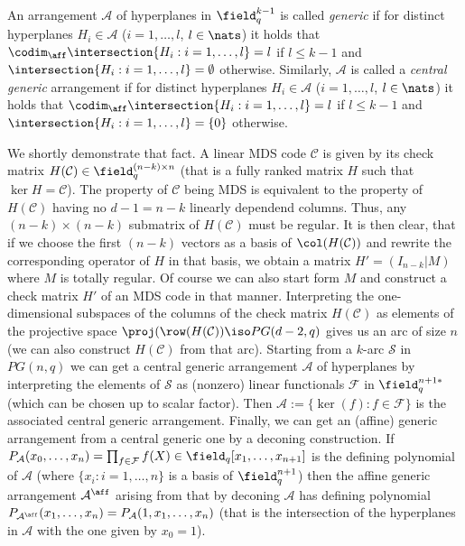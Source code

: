 \message{ !name(OnTheRAIDProblem.tex)}\documentclass[8pt,a4paper]{article}
\begin{document}
\begin{definition}
An arrangement $\mathcal{A}$ of hyperplanes in $\field_q^{k-1}$ is called \emph{generic} if for distinct hyperplanes $H_i\in\mathcal{A}$ ($i=1,\ldots,l$, $l\in\nats$) it holds that $\codim_{\aff}\intersection\{H_i:i=1,\ldots,l\}=l$ if $l\leq k-1$ and $\intersection\{H_i:i=1,\ldots,l\}=\emptyset$ otherwise.
Similarly, $\mathcal{A}$ is called a \emph{central generic} arrangement if for distinct hyperplanes $H_i\in\mathcal{A}$ ($i=1,\ldots,l$, $l\in\nats$) it holds that $\codim_{\aff}\intersection\{H_i:i=1,\ldots,l\}=l$ if $l\leq k-1$ and $\intersection\{H_i:i=1,\ldots,l\}=\{0\}$ otherwise.
\end{definition}

We shortly demonstrate that fact.
A linear MDS code $\mathcal{C}$ is given by its check matrix $H(\mathcal{C})\in\field^{(n-k)\times n}_q$ (that is a fully ranked matrix $H$ such that $\ker H=\mathcal{C}$). The property of $\mathcal{C}$ being MDS is equivalent to the property of $H(\mathcal{C})$ having no $d-1=n-k$ linearly dependend columns. Thus, any $(n-k)\times(n-k)$ submatrix of $H(\mathcal{C})$ must be regular. It is then clear, that if we choose the first $(n-k)$ vectors as a basis of $\col(H(\mathcal{C}))$ and rewrite the corresponding operator of $H$ in that basis, we obtain a matrix $H'=(I_{n-k}|M)$ where $M$ is totally regular. Of course we can also start form $M$ and construct a check matrix $H'$ of an MDS code in that manner. 
Interpreting the one-dimensional subspaces of the columns of the check matrix $H(\mathcal{C})$ as elements of the projective space $\proj(\row(H(\mathcal{C}))\iso PG(d-2,q)$ gives us an arc of size $n$ (we can also construct $H(\mathcal{C})$ from that arc).
Starting from a $k$-arc $\mathcal{S}$ in $PG(n,q)$ we can get a central generic arrangement $\mathcal{A}$ of hyperplanes by interpreting the elements of $\mathcal{S}$ as (nonzero) linear functionals $\mathcal{F}$ in $\field_q^{n+1*}$ (which can be chosen up to scalar factor). Then $\mathcal{A}:=\{\ker(f):f\in \mathcal{F}\}$ is the associated central generic arrangement.
Finally, we can get an (affine) generic arrangement from a central generic one by a deconing construction. If $P_{\mathcal{A}}(x_0,\ldots,x_n)=\prod_{f\in\mathcal{F}}{f(X)}\in\field_q[x_1,\ldots,x_{n+1}]$ is the defining polynomial of $\mathcal{A}$ (where $\{x_i:i=1,\ldots,n\}$ is a basis of $\field_q^{n+1}$) then the affine generic arrangement $\mathcal{A}^{\aff}$ arising from that by deconing $\mathcal{A}$ has defining polynomial $P_{\mathcal{A}^{\aff}}(x_1,\ldots,x_n)=P_{\mathcal{A}}(1,x_1,\ldots,x_n)$ (that is the intersection of the hyperplanes in $\mathcal{A}$ with the one given by $x_0=1$).
\end{document}
